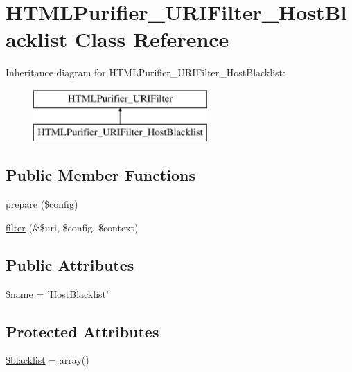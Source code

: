 \hypertarget{classHTMLPurifier__URIFilter__HostBlacklist}{\section{H\+T\+M\+L\+Purifier\+\_\+\+U\+R\+I\+Filter\+\_\+\+Host\+Blacklist Class Reference}
\label{classHTMLPurifier__URIFilter__HostBlacklist}
}
Inheritance diagram for H\+T\+M\+L\+Purifier\+\_\+\+U\+R\+I\+Filter\+\_\+\+Host\+Blacklist\+:\begin{figure}[H]
\begin{center}
\leavevmode
\includegraphics[height=2.000000cm]{classHTMLPurifier__URIFilter__HostBlacklist}
\end{center}
\end{figure}
\subsection*{Public Member Functions}
\begin{DoxyCompactItemize}
\item 
\hyperlink{classHTMLPurifier__URIFilter__HostBlacklist_ae0e453bd6b837646f9bad9bbc25527fe}{prepare} (\$config)
\item 
\hyperlink{classHTMLPurifier__URIFilter__HostBlacklist_ad961c27eeae1fb06b295448868c85383}{filter} (\&\$uri, \$config, \$context)
\end{DoxyCompactItemize}
\subsection*{Public Attributes}
\begin{DoxyCompactItemize}
\item 
\hyperlink{classHTMLPurifier__URIFilter__HostBlacklist_ade87a3cc9253685aa49b2d74347e1819}{\$name} = 'Host\+Blacklist'
\end{DoxyCompactItemize}
\subsection*{Protected Attributes}
\begin{DoxyCompactItemize}
\item 
\hyperlink{classHTMLPurifier__URIFilter__HostBlacklist_a59195baa7b4bf4c371a1201a589ca4a6}{\$blacklist} = array()
\end{DoxyCompactItemize}


